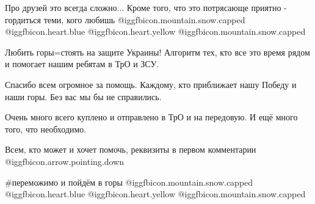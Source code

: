 Про друзей это всегда сложно... Кроме того, что это потрясающе приятно -
гордиться теми, кого любишь  @igg{fbicon.mountain.snow.capped}
@igg{fbicon.heart.blue}  @igg{fbicon.heart.yellow}
@igg{fbicon.mountain.snow.capped}  

Любить горы=стоять на защите Украины! Алгоритм тех, кто все это время рядом и
помогает нашим ребятам в ТрО и ЗСУ. 

Спасибо всем огромное за помощь. Каждому, кто приближает нашу Победу и наши
горы. Без вас мы бы не справились.

Очень много всего куплено и отправлено в ТрО и на передовую. И ещё много того,
что необходимо.

Всем, кто может и хочет помочь, реквизиты в первом комментарии @igg{fbicon.arrow.pointing.down}

\#переможимо  и пойдём в горы  @igg{fbicon.mountain.snow.capped}  @igg{fbicon.heart.blue}  @igg{fbicon.heart.yellow}  @igg{fbicon.mountain.snow.capped} 
